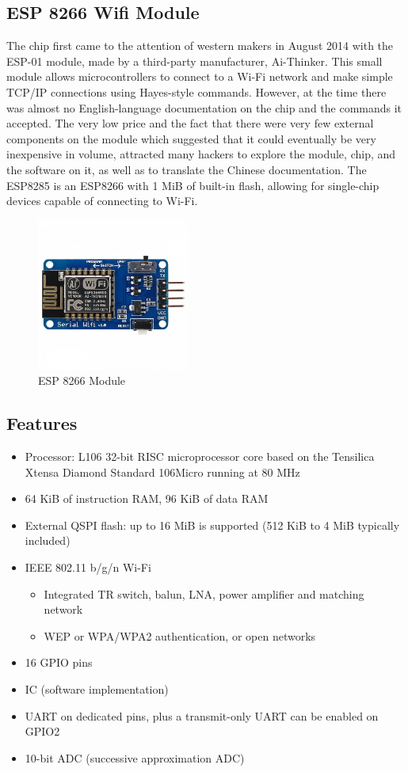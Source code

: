 \documentclass[twoside,a4paper,16pt]{book}
\begin{document}
{\subsection{ESP 8266 Wifi Module }
The chip first came to the attention of western makers in August 2014 with the ESP-01 module, made by a third-party manufacturer, Ai-Thinker. This small module allows microcontrollers to connect to a Wi-Fi network and make simple TCP/IP connections using Hayes-style commands. However, at the time there was almost no English-language documentation on the chip and the commands it accepted. The very low price and the fact that there were very few external components on the module which suggested that it could eventually be very inexpensive in volume, attracted many hackers to explore the module, chip, and the software on it, as well as to translate the Chinese documentation.
The ESP8285 is an ESP8266 with 1 MiB of built-in flash, allowing for single-chip devices capable of connecting to Wi-Fi.
\begin{figure}[ht!]
	\begin{center}
		\includegraphics[width=5.0cm]{16.jpg}
		\caption{ESP 8266 Module}
	\end{center}
\end{figure}
\subsection*{Features}
\begin{itemize}
	\item Processor: L106 32-bit RISC microprocessor core based on the Tensilica Xtensa Diamond Standard 106Micro running at 80 MHz
	\item 64 KiB of instruction RAM, 96 KiB of data RAM
	\item External QSPI flash: up to 16 MiB is supported (512 KiB to 4 MiB typically included)
	\item IEEE 802.11 b/g/n Wi-Fi
	\begin{itemize}
		\item Integrated TR switch, balun, LNA, power amplifier and matching network
		\item WEP or WPA/WPA2 authentication, or open networks
	\end{itemize}
	\item 16 GPIO pins
	\item IC (software implementation)
	\item UART on dedicated pins, plus a transmit-only UART can be enabled on GPIO2
	\item 10-bit ADC (successive approximation ADC)
	

\end{itemize}}
\end{document}
